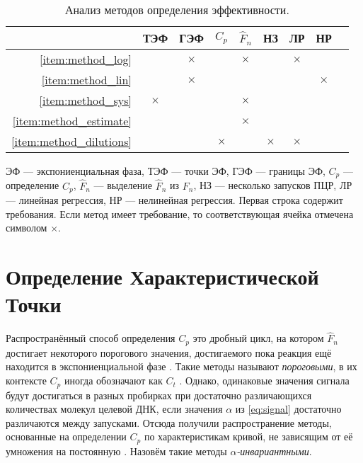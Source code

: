 \begin{table}
  {
    \centering
    \begin{tabular}{r|cccccccc}
                                  & ТЭФ      & ГЭФ      & $C_{p}$  & $\hat F_{n}$ & НЗ       & ЛР       & НР       \\\hline
      \ref{item:method_log}       &          & $\times$ &          & $\times$     &          & $\times$ &          \\
      \ref{item:method_lin}       &          & $\times$ &          &              &          &          & $\times$ \\
      \ref{item:method_sys}       & $\times$ &          &          & $\times$     &          &          &          \\
      \ref{item:method_estimate}  &          &          &          & $\times$     &          &          &          \\
      \ref{item:method_dilutions} &          &          & $\times$ &              & $\times$ & $\times$ &
    \end{tabular}
    \caption{Анализ методов определения эффективности.}
    \label{table:eff_analysis}
  }

  ЭФ --- экспониенциальная фаза, ТЭФ --- точки ЭФ, ГЭФ --- границы ЭФ, $C_{p}$
  --- определение $C_{p}$, $\hat F_{n}$ --- выделение $\hat F_{n}$ из
  $F_{n}$, НЗ --- несколько запусков ПЦР, ЛР --- линейная регрессия, НР ---
  нелинейная регрессия. Первая строка содержит требования. Если метод имеет
  требование, то соответствующая ячейка отмечена символом $\times$.
\end{table}

\section{Определение Характеристической Точки}\label{sec:cp}

Распространённый способ определения $C_{p}$ это дробный цикл, на котором
$\hat F_{n}$ достигает некоторого порогового значения, достигаемого пока
реакция ещё находится в экспониенциальной фазе
\cite{larionovStandardCurveBased2005,rasmussenQuantificationLightCycler2001}.
Такие методы называют {\it пороговыми}, в их контексте $C_{p}$ иногда
обозначают как $C_{t}$
\cite{kubistaRealtimePolymeraseChain2006,liuNewQuantitativeMethod2002}. Однако,
одинаковые значения сигнала будут достигаться в разных пробирках при достаточно
различающихся количествах молекул целевой ДНК, если значения $\alpha$ из
\eqref{eq:signal} достаточно различаются между запусками. Отсюда получили
распространение методы, основанные на определении $C_{p}$ по характеристикам
кривой, не зависящим от её умножения на постоянную
\cite{rebrikovRealtimePCRReview2006}. Назовём такие методы
{\it $\alpha$-инвариантными}.

